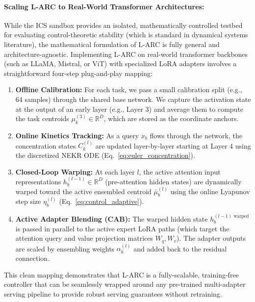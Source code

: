 \paragraph{Scaling L-ARC to Real-World Transformer Architectures:}
While the ICS sandbox provides an isolated, mathematically controlled testbed for evaluating control-theoretic stability (which is standard in dynamical systems literature), the mathematical formulation of L-ARC is fully general and architecture-agnostic. Implementing L-ARC on real-world transformer backbones (such as LLaMA, Mistral, or ViT) with specialized LoRA adapters involves a straightforward four-step plug-and-play mapping:
\begin{enumerate}
    \item \textbf{Offline Calibration:} For each task, we pass a small calibration split (e.g., 64 samples) through the shared base network. We capture the activation state at the output of an early layer (e.g., Layer 3) and average them to compute the task centroids $\mu_k^{(3)} \in \mathbb{R}^D$, which are stored as the coordinate anchors.
    \item \textbf{Online Kinetics Tracking:} As a query $x_b$ flows through the network, the concentration states $C_k^{(l)}$ are updated layer-by-layer starting at Layer 4 using the discretized NEKR ODE (Eq.~\ref{eq:euler_concentration}).
    \item \textbf{Closed-Loop Warping:} At each layer $l$, the active attention input representations $h_b^{(l-1)} \in \mathbb{R}^D$ (pre-attention hidden states) are dynamically warped toward the active ensembled centroid $\bar{\mu}_b^{(l)}$ using the online Lyapunov step size $\eta_b^{(l)}$ (Eq.~\ref{eq:control_adaptive}).
    \item \textbf{Active Adapter Blending (CAB):} The warped hidden state $h_b^{(l-1) \text{ warped}}$ is passed in parallel to the active expert LoRA paths (which target the attention query and value projection matrices $W_q, W_v$). The adapter outputs are scaled by ensembling weights $\alpha_k^{(l)}$ and added back to the residual connection.
\end{enumerate}
This clean mapping demonstrates that L-ARC is a fully-scalable, training-free controller that can be seamlessly wrapped around any pre-trained multi-adapter serving pipeline to provide robust serving guarantees without retraining.


